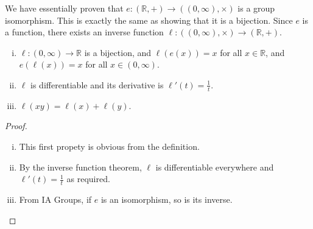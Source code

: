 \documentclass{article}
\begin{document}
\begin{remark}
    We have essentially proven that $e \colon (\mathbb R, +) \to ((0, \infty), \times)$ is a group isomorphism. This is exactly the same as showing that it is a bijection. Since $e$ is a function, there exists an inverse function $\ell \colon ((0, \infty), \times) \to (\mathbb R, +)$.
\end{remark}
\begin{theorem}
    \begin{enumerate}[(i)]
        \item $\ell \colon (0, \infty) \to \mathbb R$ is a bijection, and $\ell(e(x)) = x$ for all $x \in \mathbb R$, and $e(\ell(x)) = x$ for all $x \in (0, \infty)$.
        \item $\ell$ is differentiable and its derivative is $\ell'(t) = \frac{1}{t}$.
        \item $\ell(xy) = \ell(x) + \ell(y)$.
    \end{enumerate}
\end{theorem}
\begin{proof}
    \begin{enumerate}[(i)]
        \item This first propety is obvious from the definition.
        \item By the inverse function theorem, $\ell$ is differentiable everywhere and $\ell'(t) = \frac{1}{t}$ as required.
        \item From IA Groups, if $e$ is an isomorphism, so is its inverse.
    \end{enumerate}
\end{proof}
\end{document}
